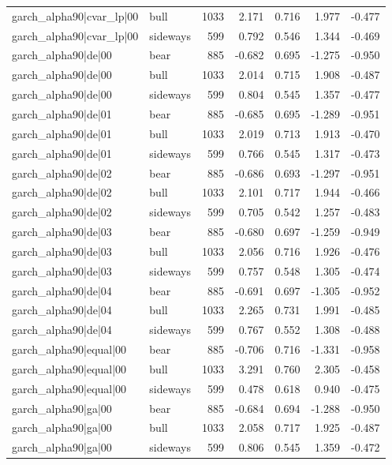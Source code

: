 \begin{table}
\begin{tabular}{llrrrrr}
garch\_alpha90|cvar\_lp|00 & bull & 1033 & 2.171 & 0.716 & 1.977 & -0.477 \\
garch\_alpha90|cvar\_lp|00 & sideways & 599 & 0.792 & 0.546 & 1.344 & -0.469 \\
garch\_alpha90|de|00 & bear & 885 & -0.682 & 0.695 & -1.275 & -0.950 \\
garch\_alpha90|de|00 & bull & 1033 & 2.014 & 0.715 & 1.908 & -0.487 \\
garch\_alpha90|de|00 & sideways & 599 & 0.804 & 0.545 & 1.357 & -0.477 \\
garch\_alpha90|de|01 & bear & 885 & -0.685 & 0.695 & -1.289 & -0.951 \\
garch\_alpha90|de|01 & bull & 1033 & 2.019 & 0.713 & 1.913 & -0.470 \\
garch\_alpha90|de|01 & sideways & 599 & 0.766 & 0.545 & 1.317 & -0.473 \\
garch\_alpha90|de|02 & bear & 885 & -0.686 & 0.693 & -1.297 & -0.951 \\
garch\_alpha90|de|02 & bull & 1033 & 2.101 & 0.717 & 1.944 & -0.466 \\
garch\_alpha90|de|02 & sideways & 599 & 0.705 & 0.542 & 1.257 & -0.483 \\
garch\_alpha90|de|03 & bear & 885 & -0.680 & 0.697 & -1.259 & -0.949 \\
garch\_alpha90|de|03 & bull & 1033 & 2.056 & 0.716 & 1.926 & -0.476 \\
garch\_alpha90|de|03 & sideways & 599 & 0.757 & 0.548 & 1.305 & -0.474 \\
garch\_alpha90|de|04 & bear & 885 & -0.691 & 0.697 & -1.305 & -0.952 \\
garch\_alpha90|de|04 & bull & 1033 & 2.265 & 0.731 & 1.991 & -0.485 \\
garch\_alpha90|de|04 & sideways & 599 & 0.767 & 0.552 & 1.308 & -0.488 \\
garch\_alpha90|equal|00 & bear & 885 & -0.706 & 0.716 & -1.331 & -0.958 \\
garch\_alpha90|equal|00 & bull & 1033 & 3.291 & 0.760 & 2.305 & -0.458 \\
garch\_alpha90|equal|00 & sideways & 599 & 0.478 & 0.618 & 0.940 & -0.475 \\
garch\_alpha90|ga|00 & bear & 885 & -0.684 & 0.694 & -1.288 & -0.950 \\
garch\_alpha90|ga|00 & bull & 1033 & 2.058 & 0.717 & 1.925 & -0.487 \\
garch\_alpha90|ga|00 & sideways & 599 & 0.806 & 0.545 & 1.359 & -0.472 \\

\end{tabular}
\end{table}
